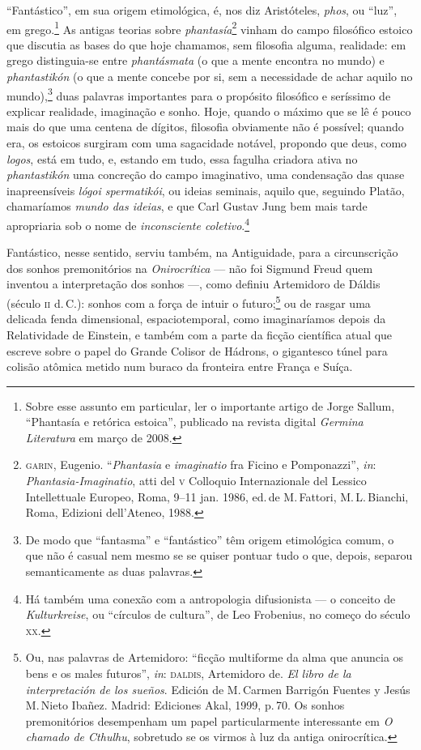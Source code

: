 ``Fantástico'', em sua origem etimológica, é, nos diz Aristóteles,
\emph{phos}, ou ``luz'', em grego.\footnote{Sobre esse assunto em
  particular, ler o importante artigo de Jorge Sallum, ``Phantasía e
  retórica estoica'', publicado na revista digital \emph{Germina
  Literatura} em março de 2008.} As antigas teorias sobre
\emph{phantasía}\footnote{\textsc{garin}, Eugenio. ``\emph{Phantasia} e
  \emph{imaginatio} fra Ficino e Pomponazzi'', \emph{in}:
  \emph{Phantasia-Imaginatio}, atti del \textsc{v} Colloquio Internazionale del
  Lessico Intellettuale Europeo, Roma, 9--11 jan. 1986, ed.\,de M.\,Fattori, 
  M.\,L.\,Bianchi, Roma, Edizioni dell'Ateneo, 1988.} vinham do
campo filosófico estoico que discutia as bases do que hoje chamamos, sem
filosofia alguma, realidade: em grego distinguia-se entre
\emph{phantásmata} (o que a mente encontra no mundo) e
\emph{phantastikón} (o que a mente concebe por si, sem a necessidade de
achar aquilo no mundo),\footnote{De modo que ``fantasma'' e
  ``fantástico'' têm origem etimológica comum, o que não é casual nem
  mesmo se se quiser pontuar tudo o que, depois, separou semanticamente
  as duas palavras.} duas palavras importantes para o propósito
filosófico e seríssimo de explicar realidade, imaginação e sonho. Hoje,
quando o máximo que se lê é pouco mais do que uma centena de dígitos,
filosofia obviamente não é possível; quando era, os estoicos surgiram
com uma sagacidade notável, propondo que deus, como \emph{logos}, está
em tudo, e, estando em tudo, essa fagulha criadora ativa no
\emph{phantastikón} uma concreção do campo imaginativo, uma condensação
das quase inapreensíveis \emph{lógoi spermatikói}, ou ideias seminais,
aquilo que, seguindo Platão, chamaríamos \emph{mundo das ideias}, e
que Carl Gustav Jung bem mais tarde apropriaria sob o nome de
\emph{inconsciente coletivo}.\footnote{Há também uma conexão com a
  antropologia difusionista --- o conceito de \emph{Kulturkreise}, ou
  ``círculos de cultura'', de Leo Frobenius, no começo do século \textsc{xx}.}

Fantástico, nesse sentido, serviu também, na Antiguidade, para a
circunscrição dos sonhos premonitórios na \emph{Onirocrítica} --- não
foi Sigmund Freud quem inventou a interpretação dos sonhos ---, como
definiu Artemidoro de Dáldis (século \textsc{ii} d.\,C.): sonhos com a força de
intuir o futuro;\footnote{Ou, nas palavras de Artemidoro: ``ficção
  multiforme da alma que anuncia os bens e os males futuros'',
  \emph{in}: \textsc{daldis}, Artemidoro de. \emph{El libro de la interpretación
  de los sueños}. Edición de M.\,Carmen Barrigón Fuentes y Jesús M.\,Nieto
  Ibañez. Madrid: Ediciones Akal, 1999, p.\,70. Os sonhos premonitórios
  desempenham um papel particularmente interessante em \emph{O chamado de
    Cthulhu}, sobretudo se os virmos à luz da antiga onirocrítica.} ou
de rasgar uma delicada fenda dimensional, espaciotemporal, como
imaginaríamos depois da Relatividade de Einstein, e também com a parte
da ficção científica atual que escreve sobre o papel do Grande Colisor
de Hádrons, o gigantesco túnel para colisão atômica metido num buraco da
fronteira entre França e Suíça.

